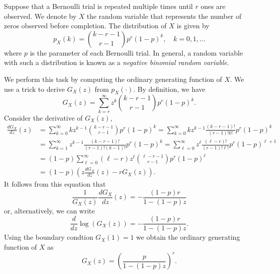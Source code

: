 \begin{example}
Suppose that a Bernoulli trial is repeated multiple times until $r$ ones are observed.
We denote by $X$ the random variable that represents the number of zeros observed before completion.
The distribution of $X$ is given by
\begin{equation*}
p_X (k) = \binom{k-r-1}{r-1} p^r (1-p)^k, \quad k = 0, 1, \ldots
\end{equation*}
where $p$ is the parameter of each Bernoulli trial.
In general, a random variable with such a distribution is known as a \emph{negative binomial random variable}. 


We perform this task by computing the ordinary generating function of $X$.
We use a trick to derive $G_X(z)$ from $p_X(\cdot)$.
By definition, we have
\begin{equation*}
G_X (z) = \sum_{k = r}^{\infty} z^k \binom{k-r-1}{r-1} p^r (1-p)^k .
\end{equation*}
Consider the derivative of $G_X(z)$,
\begin{equation*}
\begin{split}
\frac{d G_X}{dz} (z)
&= \sum_{k=0}^{\infty} k z^{k-1} \binom{k-r-1}{r-1} p^r (1-p)^k
= \sum_{k=0}^{\infty} k z^{k-1} \frac{(k-r-1)!}{(r-1)!k!} p^r (1-p)^k \\
&= \sum_{k=1}^{\infty} z^{k-1} \frac{(k-r-1)!}{(r-1)!(k-1)!} p^r (1-p)^k
= \sum_{\ell=0}^{\infty} z^{\ell} \frac{(\ell-r)!}{(r-1)!\ell!} p^r (1-p)^{\ell+1} \\
&= (1-p) \sum_{\ell=0}^{\infty} (\ell-r) z^{\ell} \binom{\ell-r-1}{r-1} p^r (1-p)^{\ell} \\
&= (1-p) \left( z \frac{d G_X}{dz} (z) - r G_X(z) \right) .
\end{split}
\end{equation*}
It follows from this equation that
\begin{equation*}
\frac{1}{G_X(z)} \frac{d G_X}{dz}(z) = - \frac{(1-p) r}{1 - (1-p) z}
\end{equation*}
or, alternatively, we can write
\begin{equation*}
\frac{d}{dz} \log \left( G_X(z) \right) = - \frac{(1-p) r}{1 - (1-p) z} .
\end{equation*}
Using the boundary condtion $G_X(1) = 1$ we obtain the ordinary generating function of $X$ as
\begin{equation*}
G_X(z) = \left( \frac{p}{1 - (1-p) z} \right)^r .
\end{equation*}
\end{example}

